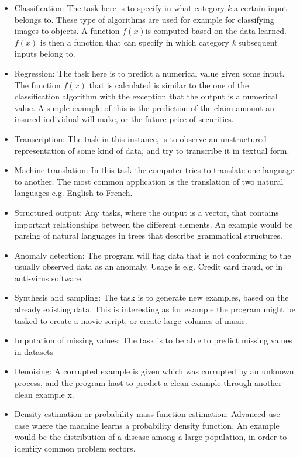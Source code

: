 \documentclass[12pt]{article}
\begin{document}
\begin{itemize}
    \item Classification: The task here is to specify in what category \textit{k} a certain input belongs to. These type of algorithms are used for example for classifying images to objects. A function $f(x)$is computed based on the data learned. $f(x)$ is then a function that can specify in which category \textit{k} subsequent inputs belong to.
    \item Regression: The task here is to predict a numerical value given some input. The function $f(x)$ that is calculated is similar to the one of the classification algorithm with the exception that the output is a numerical value. A simple example of this is the prediction of the claim amount an insured individual will make, or the future price of securities.
    \item Transcription: The task in this instance, is to observe an unstructured representation of some kind of data, and try to transcribe it in textual form.
    \item Machine translation: In this task the computer tries to translate one language to another. The most common application is the translation of two natural languages e.g. English to French. 
    \item Structured output: Any tasks, where the output is a vector, that contains important relationships between the different elements. An example would be parsing of natural languages in trees that describe grammatical structures.
    \item Anomaly detection: The program will flag data that is not conforming to the usually observed data as an anomaly. Usage is e.g. Credit card fraud, or in anti-virus software.
    \item Synthesis and sampling: The task is to generate new examples, based on the already existing data. This is interesting as for example the program might be tasked to create a movie script, or create large volumes of music.
    \item Imputation of missing values: The task is to be able to predict missing values in datasets
    \item Denoising: A corrupted example is given which was corrupted by an unknown process, and the program hast to predict a clean example through another clean example x.
    \item Density estimation or probability mass function estimation: Advanced use-case where the machine learns a probability density function. An example would be the distribution of a disease among a large population, in order to identify common problem sectors.
\end{itemize}
\end{document}
